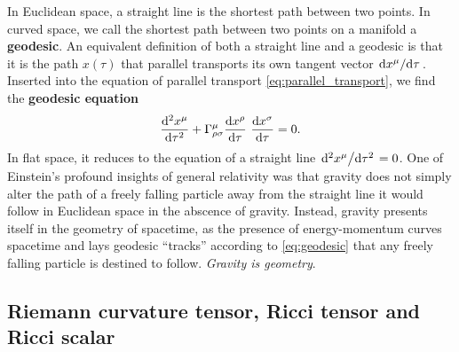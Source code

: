 In Euclidean space, a straight line is the shortest path between two points.
In curved space, we call the shortest path between two points on a manifold a \textbf{geodesic}.
An equivalent definition of both a straight line and a geodesic is that it is the path $x(\tau)$ that parallel transports its own tangent vector $\odv{x^\mu}/{\tau}$.
Inserted into the equation of parallel transport \eqref{eq:parallel_transport}, we find the \textbf{geodesic equation}
\begin{equation}
	\odv[2]{x^\mu}{\tau} + \Gamma^\mu_{\rho \sigma} \odv{x^\rho}{\tau} \odv{x^\sigma}{\tau} = 0 .
	\label{eq:geodesic}
\end{equation}
In flat space, it reduces to the equation of a straight line $\odv[2]{x^\mu}/{\tau} = 0$.
One of Einstein's profound insights of general relativity was that gravity does not simply alter the path of a freely falling particle away from the straight line it would follow in Euclidean space in the abscence of gravity.
Instead, gravity presents itself in the geometry of spacetime, as the presence of energy-momentum curves spacetime and lays geodesic ``tracks'' according to \cref{eq:geodesic} that any freely falling particle is destined to follow.
\emph{Gravity is geometry}.

\subsection{Riemann curvature tensor, Ricci tensor and Ricci scalar}


